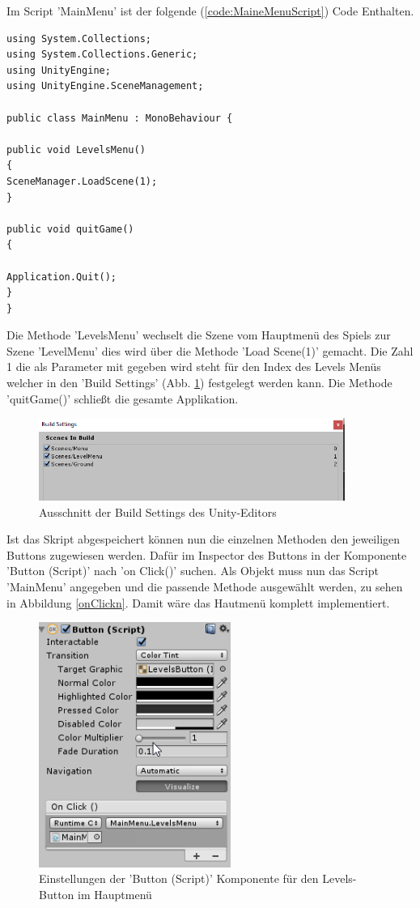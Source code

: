 Im Script 'MainMenu' ist der folgende (\cref{code:MaineMenuScript}) Code Enthalten.

\begin{lstlisting}[language={[Sharp]C}, caption=MainMenu-Script, label=code:MaineMenuScript]
using System.Collections;
using System.Collections.Generic;
using UnityEngine;
using UnityEngine.SceneManagement;

public class MainMenu : MonoBehaviour {

public void LevelsMenu()
{
SceneManager.LoadScene(1);
}

public void quitGame()
{

Application.Quit();
}
}

\end{lstlisting}

Die Methode 'LevelsMenu' wechselt die Szene vom Hauptmenü des Spiels zur Szene 'LevelMenu' dies wird über die Methode 'Load Scene(1)' gemacht. Die Zahl 1 die als Parameter mit gegeben wird steht für den Index des Levels Menüs welcher in den 'Build Settings' (Abb. \ref{BuildSettings}) festgelegt werden kann. Die Methode 'quitGame()' schließt die gesamte Applikation.
\begin{figure}[H]
	\includegraphics[width=10cm]{images/BuildSettings.png}
	\caption{Ausschnitt der Build Settings des Unity-Editors}
	\label{BuildSettings}
\end{figure}

Ist das Skript abgespeichert können nun die einzelnen Methoden den jeweiligen Buttons zugewiesen werden. Dafür im Inspector des Buttons in der Komponente 'Button (Script)' nach 'on Click()' suchen. Als Objekt muss nun das Script 'MainMenu' angegeben und die passende Methode ausgewählt werden, zu sehen in Abbildung \ref{onClickn}. Damit wäre das Hautmenü komplett implementiert.

\begin{figure}[H]
	\includegraphics[height=8cm]{images/ButtonScriptLevelsButton.png}
	\caption{Einstellungen der 'Button (Script)' Komponente für den Levels-Button im Hauptmenü}
	\label{onClick}
\end{figure}


